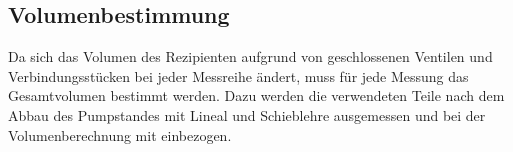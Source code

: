 \subsection{Volumenbestimmung}
Da sich das Volumen des Rezipienten aufgrund von geschlossenen Ventilen und Verbindungsstücken
bei jeder Messreihe ändert, muss für jede Messung das Gesamtvolumen bestimmt werden. Dazu werden
die verwendeten Teile nach dem Abbau des Pumpstandes mit Lineal und Schieblehre ausgemessen
und bei der Volumenberechnung mit einbezogen.
